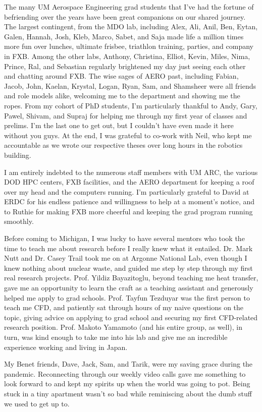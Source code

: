 The many UM Aerospace Engineering grad students that I've had the fortune of befriending over the years have been great companions on our shared journey. The largest contingent, from the MDO lab, including Alex, Ali, Anil, Ben, Eytan, Galen, Hannah, Josh, Kleb, Marco, Sabet, and Saja made life a million times more fun over lunches, ultimate frisbee, triathlon training, parties, and company in FXB. Among the other labs, Anthony, Christina, Elliot, Kevin, Miles, Nima, Prince, Ral, and Sebastian regularly brightened my day just seeing each other and chatting around FXB. The wise sages of AERO past, including Fabian, Jacob, John, Kaelan, Krystal, Logan, Ryan, Sam, and Shamsheer were all friends and role models alike, welcoming me to the department and showing me the ropes. From my cohort of PhD students, I'm particularly thankful to Andy, Gary, Pawel, Shivam, and Supraj for helping me through my first year of classes and prelims. I'm the last one to get out, but I couldn't have even made it here without you guys. At the end, I was grateful to co-work with Neil, who kept me accountable as we wrote our respective theses over long hours in the robotics building. 

I am entirely indebted to the numerous staff members with UM ARC, the various DOD HPC centers, FXB facilities, and the AERO department for keeping a roof over my head and the computers running. I'm particularly grateful to David at ERDC for his endless patience and willingness to help at a moment's notice, and to Ruthie for making FXB more cheerful and keeping the grad program running smoothly.

Before coming to Michigan, I was lucky to have several mentors who took the time to teach me about research before I really knew what it entailed. Dr. Mark Nutt and Dr. Casey Trail took me on at Argonne National Lab, even though I knew nothing about nuclear waste, and guided me step by step through my first real research projects. Prof. Yildiz Bayazitoglu, beyond teaching me heat transfer, gave me an opportunity to learn the craft as a teaching assistant and generously helped me apply to grad schools. Prof. Tayfun Tezduyar was the first person to teach me CFD, and patiently sat through hours of my naive questions on the topic, giving advice on applying to grad school and securing my first CFD-related research position. Prof. Makoto Yamamoto (and his entire group, as well), in turn, was kind enough to take me into his lab and give me an incredible experience working and living in Japan.

My Benet friends, Dave, Jack, Sam, and Tarik, were my saving grace during the pandemic. Reconnecting through our weekly video calls gave me something to look forward to and kept my spirits up when the world was going to pot. Being stuck in a tiny apartment wasn't so bad while reminiscing about the dumb stuff we used to get up to.

